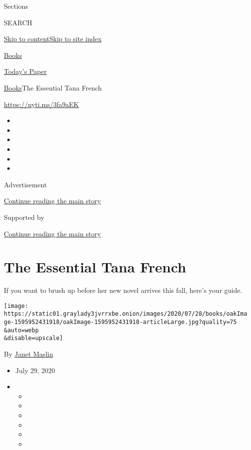 Sections

SEARCH

\protect\hyperlink{site-content}{Skip to
content}\protect\hyperlink{site-index}{Skip to site index}

\href{https://www.nytimes3xbfgragh.onion/section/books}{Books}

\href{https://myaccount.nytimes3xbfgragh.onion/auth/login?response_type=cookie\&client_id=vi}{}

\href{https://www.nytimes3xbfgragh.onion/section/todayspaper}{Today's
Paper}

\href{/section/books}{Books}\textbar{}The Essential Tana French

\url{https://nyti.ms/3fa9aEK}

\begin{itemize}
\item
\item
\item
\item
\item
\item
\end{itemize}

Advertisement

\protect\hyperlink{after-top}{Continue reading the main story}

Supported by

\protect\hyperlink{after-sponsor}{Continue reading the main story}

\hypertarget{the-essential-tana-french}{%
\section{The Essential Tana French}\label{the-essential-tana-french}}

If you want to brush up before her new novel arrives this fall, here's
your guide.

\texttt{[image: https://static01.graylady3jvrrxbe.onion/images/2020/07/28/books/oakImage-1595952431918/oakImage-1595952431918-articleLarge.jpg?quality=75\\\&auto=webp\\\&disable=upscale]}

By \href{https://www.nytimes3xbfgragh.onion/by/janet-maslin}{Janet
Maslin}

\begin{itemize}
\item
  July 29, 2020
\item
  \begin{itemize}
  \item
  \item
  \item
  \item
  \item
  \item
  \end{itemize}
\end{itemize}

